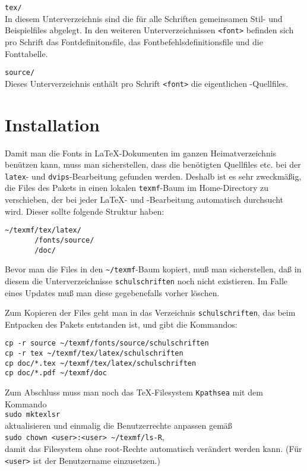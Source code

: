 \documentclass[12pt,titlepage]{article}
\begin{document}
\verb+tex/+\\
In diesem Unterverzeichnis sind die f\"ur alle Schriften gemeinsamen
Stil- und Beispielfiles
abgelegt. In den weiteren Unterverzeichnissen
 \verb+<font>+ befinden sich pro Schrift das
Fontdefinitonsfile, das Fontbefehlsdefinitionsfile 
und die Fonttabelle.

\verb+source/+\\
Dieses Unterverzeichnis enth\"alt pro Schrift \verb+<font>+ die eigentlichen
\MF-Quellfiles.

\section{Installation}
Damit man die Fonts in \LaTeX-Dokumenten im 
 ganzen Heimatverzeichnis
ben\"utzen kann, muss man sicherstellen, dass die ben\"otigten Quellfiles etc.
bei der \verb+latex+- und \verb+dvips+-Bearbeitung gefunden werden. 
Deshalb ist es sehr zweckm\"a\ss{}ig, die Files des Pakets
in einen lokalen \verb+texmf+-Baum im Home-Directory zu verschieben,
der bei jeder \LaTeX- und \MF-Bearbeitung automatisch durchsucht wird.
Dieser sollte folgende Struktur haben:
\begin{verbatim}
~/texmf/tex/latex/
       /fonts/source/
       /doc/
\end{verbatim}
Bevor man die Files in den \verb+~/texmf+-Baum kopiert, mu\ss{}
man sicherstellen, da\ss{} in diesem die Unterverzeichnisse 
\verb+schulschriften+ noch nicht existieren. Im Falle eines Updates
mu\ss{} man diese gegebenefalls vorher l\"oschen.

Zum Kopieren der Files geht man 
in das Verzeichnis \verb+schulschriften+, 
das beim Entpacken des Pakets entstanden ist, und gibt die Kommandos:
\begin{verbatim}
cp -r source ~/texmf/fonts/source/schulschriften
cp -r tex ~/texmf/tex/latex/schulschriften
cp doc/*.tex ~/texmf/tex/latex/schulschriften
cp doc/*.pdf ~/texmf/doc
\end{verbatim}
Zum Abschluss muss man noch das \TeX-Filesystem \verb+Kpathsea+
mit dem   Kommando\\
\verb+sudo mktexlsr+\\
aktualisieren und einmalig die Benutzerrechte anpassen gem\"a\ss{}\\
\verb+sudo chown <user>:<user> ~/texmf/ls-R+,\\
damit das Filesystem ohne root-Rechte automatisch ver\"andert werden
kann.
(F\"ur \verb+<user>+ ist der Benutzername einzusetzen.) 
\end{document}
